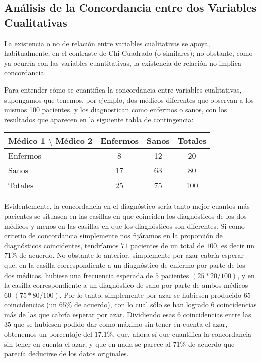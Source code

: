 \subsection{Análisis de la Concordancia entre dos Variables Cualitativas}
La existencia o no de relación entre variables cualitativas se apoya, habitualmente, en el contraste de Chi Cuadrado (o
similares); no obstante, como ya ocurría con las variables cuantitativas, la existencia de relación no implica
concordancia.

Para entender cómo se cuantifica la concordancia entre variables cualitativas, supongamos que tenemos, por ejemplo, dos
médicos diferentes que observan a los mismos 100 pacientes, y los diagnostican como enfermos o sanos, con los resultados
que aparecen en la siguiente tabla de contingencia:

\begin{center}
\begin{tabular}{|l|c|c|c|}
\hline
Médico 1 $\setminus$ Médico 2 & Enfermos & Sanos & Totales \\
\hline
Enfermos & 8 & 12 & 20 \\
\hline
Sanos & 17 & 63 & 80 \\
\hline
Totales & 25 & 75 & 100 \\
\hline
\end{tabular}
\end{center}

Evidentemente, la concordancia en el diagnóstico sería tanto mejor cuantos más pacientes se situasen en las casillas en
que coinciden los diagnósticos de los dos médicos y menos en las casillas en que los diagnósticos son diferentes. Si
como criterio de concordancia simplemente nos fijáramos en la proporción de diagnósticos coincidentes, tendríamos $71$
pacientes de un total de $100$, es decir un $71\%$ de acuerdo.
No obstante lo anterior, simplemente por azar cabría esperar que, en la casilla correspondiente a un diagnóstico de
enfermo por parte de los dos médicos, hubiese una frecuencia esperada de $5$ pacientes $(25*20/100)$, y en la casilla
correspondiente a un diagnóstico de sano por parte de ambos médicos $60$ $(75*80/100)$. Por lo tanto, simplemente por
azar se hubiesen producido $65$ coincidencias (un $65\%$ de acuerdo), con lo cual sólo se han logrado $6$ coincidencias
más de las que cabría esperar por azar. Dividiendo esas $6$ coincidencias entre las $35$ que se hubiesen podido dar como
máximo sin tener en cuenta el azar, obtenemos un porcentaje del $17.1\%$, que, ahora sí que cuantifica la concordancia
sin tener en cuenta el azar, y que en nada se parece al $71\%$ de acuerdo que parecía deducirse de los datos originales.

